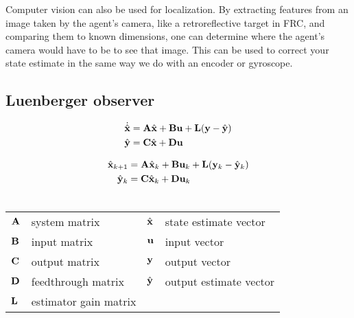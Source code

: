 Computer vision can also be used for \gls{localization}. By extracting features
from an image taken by the \gls{agent}'s camera, like a retroreflective target
in FRC, and comparing them to known dimensions, one can determine where the
\gls{agent}'s camera would have to be to see that image. This can be used to
correct your state estimate in the same way we do with an encoder or gyroscope.

\subsection{Luenberger observer}

\begin{theorem}
  \begin{align}
    \dot{\hat{\mathbf{x}}} &= \mathbf{A}\hat{\mathbf{x}} + \mathbf{B}\mathbf{u} +
      \mathbf{L} (\mathbf{y} - \hat{\mathbf{y}}) \label{eq:s_obsv_x} \\
    \hat{\mathbf{y}} &= \mathbf{C}\hat{\mathbf{x}} + \mathbf{D}\mathbf{u} \label{eq:s_obsv_y}
  \end{align}

  \begin{align}
    \hat{\mathbf{x}}_{k+1} &= \mathbf{A}\hat{\mathbf{x}}_k + \mathbf{B}\mathbf{u}_k +
      \mathbf{L}(\mathbf{y}_k - \hat{\mathbf{y}}_k) \label{eq:z_obsv_x} \\
    \hat{\mathbf{y}}_k &= \mathbf{C}\hat{\mathbf{x}}_k + \mathbf{D}\mathbf{u}_k
      \label{eq:z_obsv_y} \\ \nonumber
  \end{align}

  \begin{figurekey}
    \begin{tabulary}{\linewidth}{LLLL}
      $\mathbf{A}$ & system matrix      & $\hat{\mathbf{x}}$ & state estimate vector \\
      $\mathbf{B}$ & input matrix       & $\mathbf{u}$ & input vector \\
      $\mathbf{C}$ & output matrix      & $\mathbf{y}$ & output vector \\
      $\mathbf{D}$ & feedthrough matrix & $\hat{\mathbf{y}}$ & output estimate vector \\
      $\mathbf{L}$ & estimator gain matrix & & \\
    \end{tabulary}
  \end{figurekey}
\end{theorem}

